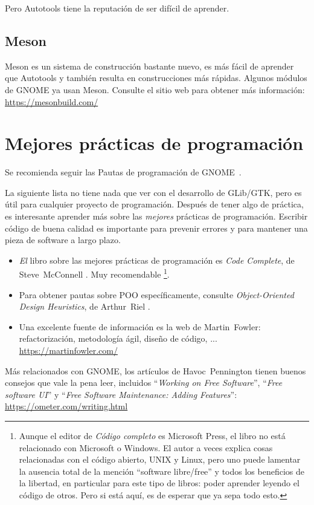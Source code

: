 Pero Autotools tiene la reputación de ser difícil de aprender.

\subsection{Meson}

Meson es un sistema de construcción bastante nuevo, es más fácil de aprender que Autotools y también resulta en construcciones más rápidas. Algunos módulos de GNOME ya usan Meson. Consulte el sitio web para obtener más información:\\
\url{https://mesonbuild.com/}

\section{Mejores prácticas de programación}

Se recomienda seguir las Pautas de programación de GNOME~\cite{gnome-programming-guidelines}.

La siguiente lista no tiene nada que ver con el desarrollo de GLib/GTK, pero es útil para cualquier proyecto de programación. Después de tener algo de práctica, es interesante aprender más sobre las \emph{mejores} prácticas de programación. Escribir código de buena calidad es importante para prevenir errores y para mantener una pieza de software a largo plazo.

\begin{itemize}
  \item \emph{El} libro sobre las mejores prácticas de programación es \emph{Code Complete}, de Steve~McConnell \cite{code-complete}. Muy recomendable \footnote{Aunque el editor de \emph{Código completo} es Microsoft Press, el libro no está relacionado con Microsoft o Windows. El autor a veces explica cosas relacionadas con el código abierto, UNIX y Linux, pero uno puede lamentar la ausencia total de la mención ``software libre/free'' y todos los beneficios de la libertad, en particular para este tipo de libros: poder aprender leyendo el código de otros. Pero si está aquí, es de esperar que ya sepa todo esto.}.

  \item Para obtener pautas sobre POO específicamente, consulte \emph{Object-Oriented Design Heuristics}, de Arthur~Riel \cite{oop-book}.

  \item Una excelente fuente de información es la web de Martin~Fowler: refactorización, metodología ágil, diseño de código, ...\\
  \url{https://martinfowler.com/}
\end{itemize}

Más relacionados con GNOME, los artículos de Havoc~Pennington tienen buenos consejos que vale la pena leer, incluidos ``\emph{Working on Free Software}'', ``\emph{Free software UI}'' y ``\emph{Free Software Maintenance: Adding Features}'':\\
\url{https://ometer.com/writing.html}